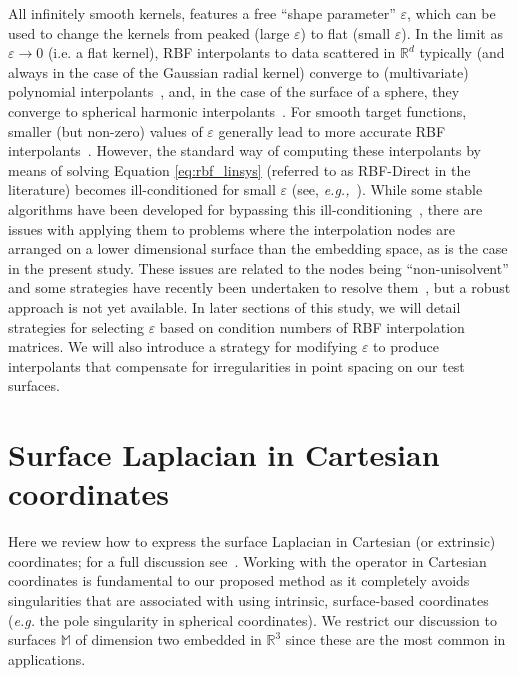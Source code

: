\documentclass[smallextended]{svjour3}
\newcommand{\ep}{\varepsilon}
\begin{document}
All infinitely smooth kernels, features a free ``shape parameter'' $\ep$, which can be used to change the kernels from peaked (large $\ep$) to flat (small $\ep$). In the limit as $\ep\to 0$ (i.e. a flat kernel), RBF interpolants to data scattered in $\mathbb{R}^d$ typically (and always in the case of the Gaussian radial kernel) converge to (multivariate) polynomial interpolants~\cite{DriscollFornberg2002,LarFor05,Sch05}, and, in the case of the surface of a sphere, they converge to spherical harmonic interpolants~\cite{FoPi07}.  For smooth target functions, smaller (but non-zero) values of $\ep$ generally lead to more accurate RBF interpolants~\cite{FoWr,LarFor05}.  However, the standard way of computing these interpolants by means of solving Equation \eqref{eq:rbf_linsys} (referred to as RBF-Direct in the literature) becomes ill-conditioned for small $\ep$ (see, \emph{e.g.,}~\cite{FZ07}).  While some stable algorithms have been developed for bypassing this ill-conditioning~\cite{FoWr,FoPi07,FaMC12,FLF,FoLePo13}, there are issues with applying them to problems where the interpolation nodes are arranged on a lower dimensional surface than the embedding space, as is the case in the present study.  These issues are related to the nodes being ``non-unisolvent'' and some strategies have recently been undertaken to resolve them~\cite{LLHF}, but a robust approach is not yet available.  In later sections of this study, we will detail strategies for selecting $\ep$ based on condition numbers of RBF interpolation matrices. We will also introduce a strategy for modifying $\ep$ to produce interpolants that compensate for irregularities in point spacing on our test surfaces.  





\section{Surface Laplacian in Cartesian coordinates}
Here we review how to express the surface Laplacian in Cartesian (or extrinsic) coordinates; for a full discussion see~\cite{FuselierWright2012}.  Working with the operator in Cartesian coordinates is fundamental to our proposed method as it completely avoids singularities that are associated with using intrinsic, surface-based coordinates ({\em e.g.} the pole singularity in spherical coordinates).  We restrict our discussion to surfaces $\mathbb{M}$ of dimension two embedded in $\mathbb{R}^3$ since these are the most common in applications.
\end{document}
